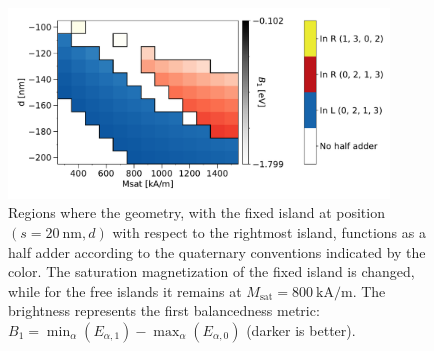 \documentclass[11pt,a4paper,english,twoside]{article}
\begin{document}
\begin{figure}[hb!]
    \centering
    \includegraphics[width=0.9\textwidth]{Figures/half_adder/sweep/000006_d-Msat/table(d100-200_10,Msat3e5-15e5_1e5)_balanced1.pdf}
    \caption{Regions where the geometry, with the fixed island at position $(s=\SI{20}{\nano\metre}, d)$ with respect to the rightmost island, functions as a half adder according to the quaternary conventions indicated by the color. The saturation magnetization of the fixed island is changed, while for the free islands it remains at $M_\mathrm{sat} = \SI{800}{\kilo\ampere\per\metre}$. The brightness represents the first balancedness metric: $B_1 = \min_\alpha(E_{\alpha,1}) - \max_\alpha(E_{\alpha,0})$ (darker is better).} 
    \label{fig:HalfAdder_000006_sweep_d-Msat_balanced1}
\end{figure}
\end{document}
